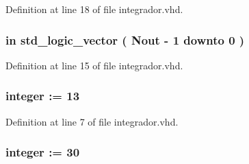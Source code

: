 Definition at line 18 of file integrador.\+vhd.

\hypertarget{classintegrador_a436836a2e79668e0976eef3a553b5406}{}
\subsubsection[{M\+A\+X}]{ {\bfseries \textcolor{keywordflow}{in}\textcolor{vhdlchar}{ }} {\bfseries \textcolor{comment}{std\+\_\+logic\+\_\+vector}\textcolor{vhdlchar}{ }\textcolor{vhdlchar}{(}\textcolor{vhdlchar}{ }\textcolor{vhdlchar}{ }\textcolor{vhdlchar}{ }\textcolor{vhdlchar}{ }{\bfseries {\bf Nout}} \textcolor{vhdlchar}{-\/}\textcolor{vhdlchar}{ } \textcolor{vhdldigit}{1} \textcolor{vhdlchar}{ }\textcolor{keywordflow}{downto}\textcolor{vhdlchar}{ }\textcolor{vhdlchar}{ } \textcolor{vhdldigit}{0} \textcolor{vhdlchar}{ }\textcolor{vhdlchar}{)}\textcolor{vhdlchar}{ }} \hspace{0.3cm}{\ttfamily [Port]}}\label{classintegrador_a436836a2e79668e0976eef3a553b5406}


Definition at line 15 of file integrador.\+vhd.

\hypertarget{classintegrador_a2629ecb3bb37e8104b2866b0fd0c8574}{}
\subsubsection[{Nin}]{ {\bfseries \textcolor{vhdlchar}{ }} {\bfseries \textcolor{comment}{integer}\textcolor{vhdlchar}{ }\textcolor{vhdlchar}{ }\textcolor{vhdlchar}{\+:}\textcolor{vhdlchar}{=}\textcolor{vhdlchar}{ }\textcolor{vhdlchar}{ } \textcolor{vhdldigit}{13} \textcolor{vhdlchar}{ }} \hspace{0.3cm}{\ttfamily [Generic]}}\label{classintegrador_a2629ecb3bb37e8104b2866b0fd0c8574}


Definition at line 7 of file integrador.\+vhd.

\hypertarget{classintegrador_a061c0d632c8bdf5dd32c80acf9a9c475}{}
\subsubsection[{Nout}]{ {\bfseries \textcolor{vhdlchar}{ }} {\bfseries \textcolor{comment}{integer}\textcolor{vhdlchar}{ }\textcolor{vhdlchar}{ }\textcolor{vhdlchar}{\+:}\textcolor{vhdlchar}{=}\textcolor{vhdlchar}{ }\textcolor{vhdlchar}{ } \textcolor{vhdldigit}{30} \textcolor{vhdlchar}{ }} \hspace{0.3cm}{\ttfamily [Generic]}}\label{classintegrador_a061c0d632c8bdf5dd32c80acf9a9c475}


